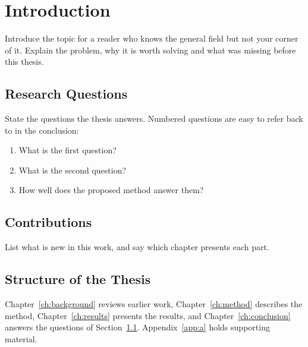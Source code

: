 \chapter{Introduction}
\label{ch:introduction}

Introduce the topic for a reader who knows the general field but not your
corner of it. Explain the problem, why it is worth solving and what was
missing before this thesis.

\section{Research Questions}
\label{sec:questions}

State the questions the thesis answers. Numbered questions are easy to
refer back to in the conclusion:
\begin{enumerate}
  \item What is the first question?
  \item What is the second question?
  \item How well does the proposed method answer them?
\end{enumerate}

\section{Contributions}
\label{sec:contributions}

List what is new in this work, and say which chapter presents each part.

\section{Structure of the Thesis}
\label{sec:structure}

Chapter~\ref{ch:background} reviews earlier work, Chapter~\ref{ch:method}
describes the method, Chapter~\ref{ch:results} presents the results, and
Chapter~\ref{ch:conclusion} answers the questions of
Section~\ref{sec:questions}. Appendix~\ref{app:a} holds supporting
material.
